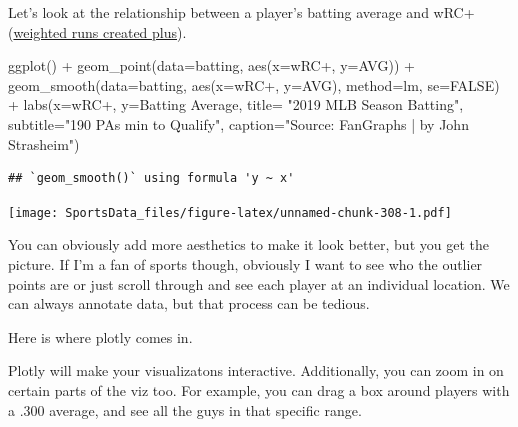 \documentclass[
]{book}
\newenvironment{Shaded}{\begin{snugshade}}{\end{snugshade}}
\newcommand{\AttributeTok}[1]{\textcolor[rgb]{0.77,0.63,0.00}{#1}}
\newcommand{\ConstantTok}[1]{\textcolor[rgb]{0.00,0.00,0.00}{#1}}
\newcommand{\FunctionTok}[1]{\textcolor[rgb]{0.00,0.00,0.00}{#1}}
\newcommand{\NormalTok}[1]{#1}
\newcommand{\SpecialCharTok}[1]{\textcolor[rgb]{0.00,0.00,0.00}{#1}}
\newcommand{\StringTok}[1]{\textcolor[rgb]{0.31,0.60,0.02}{#1}}
\begin{document}
Let's look at the relationship between a player's batting average and wRC+ (\href{http://m.mlb.com/glossary/advanced-stats/weighted-runs-created-plus}{weighted runs created plus}).

\begin{Shaded}
\begin{Highlighting}[]
\FunctionTok{ggplot}\NormalTok{() }\SpecialCharTok{+}
  \FunctionTok{geom\_point}\NormalTok{(}\AttributeTok{data=}\NormalTok{batting, }\FunctionTok{aes}\NormalTok{(}\AttributeTok{x=}\StringTok{\textasciigrave{}}\AttributeTok{wRC+}\StringTok{\textasciigrave{}}\NormalTok{, }\AttributeTok{y=}\NormalTok{AVG)) }\SpecialCharTok{+}
  \FunctionTok{geom\_smooth}\NormalTok{(}\AttributeTok{data=}\NormalTok{batting, }\FunctionTok{aes}\NormalTok{(}\AttributeTok{x=}\StringTok{\textasciigrave{}}\AttributeTok{wRC+}\StringTok{\textasciigrave{}}\NormalTok{, }\AttributeTok{y=}\NormalTok{AVG), }\AttributeTok{method=}\StringTok{\textquotesingle{}lm\textquotesingle{}}\NormalTok{, }\AttributeTok{se=}\ConstantTok{FALSE}\NormalTok{) }\SpecialCharTok{+}
  \FunctionTok{labs}\NormalTok{(}\AttributeTok{x=}\StringTok{\textquotesingle{}wRC+\textquotesingle{}}\NormalTok{, }\AttributeTok{y=}\StringTok{\textquotesingle{}Batting Average\textquotesingle{}}\NormalTok{, }\AttributeTok{title=} \StringTok{"2019 MLB Season Batting"}\NormalTok{, }\AttributeTok{subtitle=}\StringTok{"190 PAs min to Qualify"}\NormalTok{, }\AttributeTok{caption=}\StringTok{"Source:  FanGraphs | by John Strasheim"}\NormalTok{)}
\end{Highlighting}
\end{Shaded}

\begin{verbatim}
## `geom_smooth()` using formula 'y ~ x'
\end{verbatim}

\texttt{[image: SportsData\_files/figure-latex/unnamed-chunk-308-1.pdf]}

You can obviously add more aesthetics to make it look better, but you get the picture. If I'm a fan of sports though, obviously I want to see who the outlier points are or just scroll through and see each player at an individual location. We can always annotate data, but that process can be tedious.

Here is where plotly comes in.

Plotly will make your visualizatons interactive. Additionally, you can zoom in on certain parts of the viz too. For example, you can drag a box around players with a .300 average, and see all the guys in that specific range.
\end{document}
